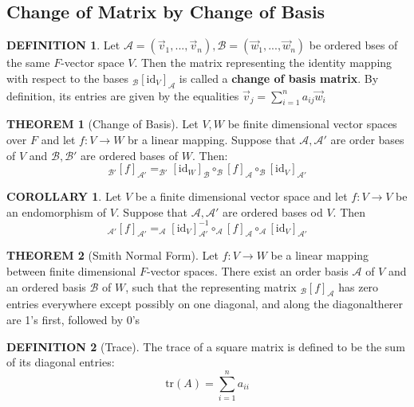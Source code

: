 \documentclass[10pt]{article}
\theoremstyle{definition}
\newtheorem{definition}{DEFINITION}[subsection]
\newtheorem{theorem}{THEOREM}[subsection]
\newtheorem{corollary}{COROLLARY}[subsection]
\begin{document}
\subsection{Change of Matrix by Change of Basis}
\begin{definition}
    Let $\mathcal{A} = (\vec{v}_1,...,\vec{v}_n), \mathcal{B} = (\vec{w}_1,...,\vec{w}_n)$ be ordered bses of the same $F$-vector space $V$. Then the matrix representing the identity mapping with respect to the bases $_\mathcal{B}[\text{id}_V]_\mathcal{A}$ is called a \textbf{change of basis matrix}. By definition, its entries are given by the equalities $\vec{v}_j = \sum_{i=1}^n{a_{ij}\vec{w}_i}$
\end{definition}

\begin{theorem}[Change of Basis]
    Let $V,W$ be finite dimensional vector spaces over $F$ and let $f:V \rightarrow W$ br a linear mapping. Suppose that $\mathcal{A,A'}$ are order bases of $V$ and $\mathcal{B,B'}$ are ordered bases of $W$. Then:
    $$_\mathcal{B'}[f]_\mathcal{A'} = _\mathcal{B'}[\text{id}_W]_\mathcal{B} \circ _\mathcal{B}[f]_\mathcal{A} \circ _\mathcal{B}[\text{id}_V]_\mathcal{A'}$$
\end{theorem}

\begin{corollary}
    Let $V$ be a finite dimensional vector space and let $f:V\rightarrow V$ be an endomorphism of $V$. Suppose that $\mathcal{A,A'}$ are ordered bases od $V$. Then 
    $$_\mathcal{A'}[f]_\mathcal{A'} = _\mathcal{A}[\text{id}_V]_\mathcal{A'}^{-1} \circ _\mathcal{A}[f]_\mathcal{A} \circ _\mathcal{A}[\text{id}_V]_\mathcal{A'}$$
\end{corollary}

\begin{theorem}[Smith Normal Form]
    Let $f:V\rightarrow W$ be a linear mapping between finite dimensional $F$-vector spaces. There exist an order basis $\mathcal{A}$ of $V$ and an ordered basis $\mathcal{B}$ of $W$, such that the representing matrix $_\mathcal{B}[f]_\mathcal{A}$ has zero entries everywhere except possibly on one diagonal, and along the diagonaltherer are 1's first, followed by 0's  
\end{theorem}

\begin{definition}[Trace]
    The trace of a square matrix is defined to be the sum of its diagonal entries:
    $$\text{tr}(A) = \sum_{i=1}^{n}{a_{ii}}$$
\end{definition}
\end{document}
